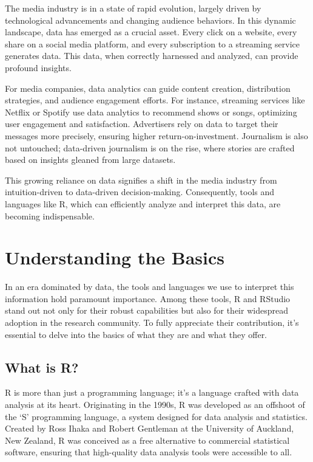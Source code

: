 \documentclass[
  b5paper]{book}
\begin{document}
The media industry is in a state of rapid evolution, largely driven by technological advancements and changing audience behaviors. In this dynamic landscape, data has emerged as a crucial asset. Every click on a website, every share on a social media platform, and every subscription to a streaming service generates data. This data, when correctly harnessed and analyzed, can provide profound insights.

For media companies, data analytics can guide content creation, distribution strategies, and audience engagement efforts. For instance, streaming services like Netflix or Spotify use data analytics to recommend shows or songs, optimizing user engagement and satisfaction. Advertisers rely on data to target their messages more precisely, ensuring higher return-on-investment. Journalism is also not untouched; data-driven journalism is on the rise, where stories are crafted based on insights gleaned from large datasets.

This growing reliance on data signifies a shift in the media industry from intuition-driven to data-driven decision-making. Consequently, tools and languages like R, which can efficiently analyze and interpret this data, are becoming indispensable.

\hypertarget{understanding-the-basics}{%
\section{Understanding the Basics}\label{understanding-the-basics}}

In an era dominated by data, the tools and languages we use to interpret this information hold paramount importance. Among these tools, R and RStudio stand out not only for their robust capabilities but also for their widespread adoption in the research community. To fully appreciate their contribution, it's essential to delve into the basics of what they are and what they offer.

\hypertarget{what-is-r}{%
\subsection*{What is R?}\label{what-is-r}}

R is more than just a programming language; it's a language crafted with data analysis at its heart. Originating in the 1990s, R was developed as an offshoot of the `S' programming language, a system designed for data analysis and statistics. Created by Ross Ihaka and Robert Gentleman at the University of Auckland, New Zealand, R was conceived as a free alternative to commercial statistical software, ensuring that high-quality data analysis tools were accessible to all.
\end{document}
